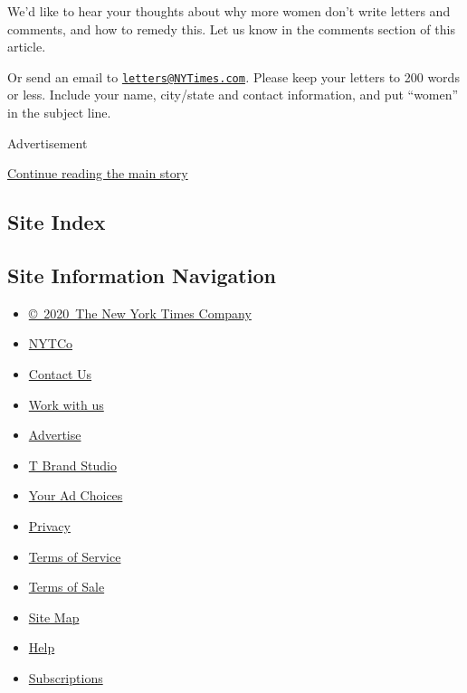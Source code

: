 We'd like to hear your thoughts about why more women don't write letters
and comments, and how to remedy this. Let us know in the comments
section of this article.

Or send an email to
\href{mailto:letters@NYTimes.com}{\nolinkurl{letters@NYTimes.com}}\emph{.}
Please keep your letters to 200 words or less. Include your name,
city/state and contact information, and put ``women'' in the subject
line.

Advertisement

\protect\hyperlink{after-bottom}{Continue reading the main story}

\hypertarget{site-index}{%
\subsection{Site Index}\label{site-index}}

\hypertarget{site-information-navigation}{%
\subsection{Site Information
Navigation}\label{site-information-navigation}}

\begin{itemize}
\tightlist
\item
  \href{https://help.nytimes3xbfgragh.onion/hc/en-us/articles/115014792127-Copyright-notice}{©~2020~The
  New York Times Company}
\end{itemize}

\begin{itemize}
\tightlist
\item
  \href{https://www.nytco.com/}{NYTCo}
\item
  \href{https://help.nytimes3xbfgragh.onion/hc/en-us/articles/115015385887-Contact-Us}{Contact
  Us}
\item
  \href{https://www.nytco.com/careers/}{Work with us}
\item
  \href{https://nytmediakit.com/}{Advertise}
\item
  \href{http://www.tbrandstudio.com/}{T Brand Studio}
\item
  \href{https://www.nytimes3xbfgragh.onion/privacy/cookie-policy\#how-do-i-manage-trackers}{Your
  Ad Choices}
\item
  \href{https://www.nytimes3xbfgragh.onion/privacy}{Privacy}
\item
  \href{https://help.nytimes3xbfgragh.onion/hc/en-us/articles/115014893428-Terms-of-service}{Terms
  of Service}
\item
  \href{https://help.nytimes3xbfgragh.onion/hc/en-us/articles/115014893968-Terms-of-sale}{Terms
  of Sale}
\item
  \href{https://spiderbites.nytimes3xbfgragh.onion}{Site Map}
\item
  \href{https://help.nytimes3xbfgragh.onion/hc/en-us}{Help}
\item
  \href{https://www.nytimes3xbfgragh.onion/subscription?campaignId=37WXW}{Subscriptions}
\end{itemize}
